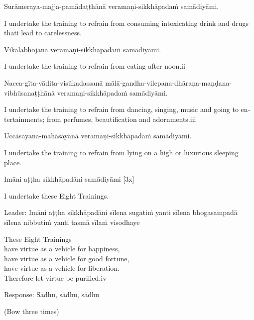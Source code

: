 Surāmeraya-majja-pamādaṭṭhānā veramaṇi-sikkhāpadaṁ samādiyāmi.\\

\begin{english}
I undertake the training to refrain from consuming intoxicating drink and drugs thati lead to carelessness.\\
\end{english}

Vikālabhojanā veramaṇi-sikkhāpadaṁ samādiyāmi.\\

\begin{english}
I undertake the training to refrain from eating after noon.ii\\
\end{english}

Nacca-gīta-vādita-visūkadassanā mālā-gandha-vilepana-dhāraṇa-maṇḍana-vibhūsanaṭṭhānā veramaṇi-sikkhāpadaṁ samādiyāmi.\\

\begin{english}
I undertake the training to refrain from dancing, singing, music and going to entertainments; from perfumes, beautification and adornments.iii\\
\end{english}

Uccāsayana-mahāsayanā veramaṇi-sikkhāpadaṁ samādiyāmi.\\

\begin{english}
I undertake the training to refrain from lying on a high or luxurious sleeping place.\\
\end{english}

Imāni aṭṭha sikkhāpadāni samādiyāmi \hfill{[3x]}\\

\begin{english}
I undertake these Eight Trainings.\\
\end{english}

Leader: Imāni aṭṭha sikkhāpadāni sīlena sugatiṁ yanti sīlena bhogasampadā sīlena nibbutiṁ yanti tasmā sīlaṁ visodhaye\\

\begin{english}
These Eight Trainings\\
have virtue as a vehicle for happiness,\\
have virtue as a vehicle for good fortune,\\
have virtue as a vehicle for liberation.\\
Therefore let virtue be purified.iv\\
\end{english}

Response: Sādhu, sādhu, sādhu\\

\begin{center}
(Bow three times)\\
\end{center}
